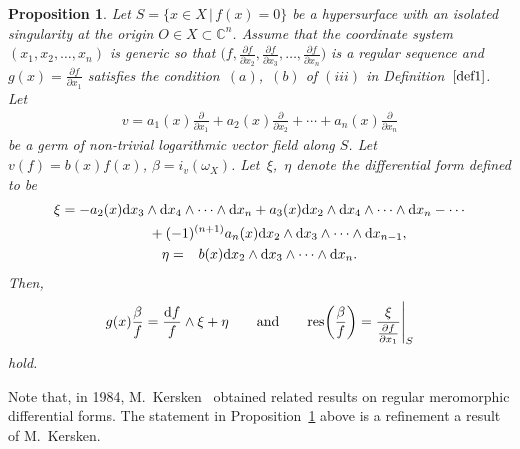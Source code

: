 \documentclass[10pt,a4paper]{amsart}
\numberwithin{equation}{section}
\newtheorem{Proposition}[Theorem]{Proposition}
 { \theoremstyle{definition}
\newtheorem{Definition}[Theorem]{Definition}
\newtheorem{Remark}[Theorem]{Remark}
\newtheorem{Example}[Theorem]{Example}
 }
\begin{document}
\begin{Proposition}\label{pro4}
 Let $S=\{ x \in X \,|\, f(x)=0 \} $ be a hypersurface with an isolated singularity at the origin $ O \in X \subset {\mathbb C}^n$.
Assume that the coordinate system $ (x_1,x_2,\ldots,x_n) $ is generic so that
$\big(f, \frac{\partial f}{\partial x_2}, \frac{\partial f}{\partial x_3},\ldots,\frac{\partial f}{\partial x_{n}}\big)$ is a regular sequence and $ g(x) =\frac{\partial f}{\partial x_1} $ satisfies the condition~$(a)$,~$(b)$ of $(iii)$ in Definition~$\ref{def1}$.
Let
\begin{gather*}
v=a_1(x)\frac{\partial}{\partial x_1} + a_2(x)\frac{\partial}{\partial x_2}+ \cdots +a_n(x)\frac{\partial}{\partial x_n}
\end{gather*}
be a germ of non-trivial logarithmic vector field along $S$. Let $ v(f)=b(x)f(x)$, $\beta=i_v(\omega_X)$. Let~$\xi$,~$\eta$ denote the differential form defined to be
\begin{gather*}
\xi = -a_2(x){\rm d}x_3 \wedge {\rm d}x_4 \wedge \cdots \wedge {\rm d}x_n +a_3(x){\rm d}x_2 \wedge {\rm d}x_4 \wedge \cdots \wedge {\rm d}x_n - \cdots
\\\phantom{\xi =-}{}
 +(-1)^{(n+1)}a_n(x){\rm d}x_2 \wedge {\rm d}x_3 \wedge \cdots \wedge {\rm d}x_{n-1}, \\
\eta = \phantom{-}b(x) {\rm d}x_2 \wedge {\rm d}x_3 \wedge \cdots \wedge {\rm d}x_n.
\end{gather*}
Then,
\begin{gather*}
g(x)\frac{\beta}{f} = \frac{{\rm d}f}{f}\wedge \xi + \eta\qquad
\text{and} \qquad
{\rm res}\bigg(\frac{\beta}{f}\bigg) = \frac{\xi}{\frac{\partial f}{\partial x_1}}\Bigg|_S
\end{gather*}
 hold.
 \end{Proposition}

Note that, in 1984, M.~Kersken~\cite{K84} obtained related results on regular meromorphic differential forms. The statement in Proposition~\ref{pro4} above is a refinement a result of M.~Kersken.
\end{document}
